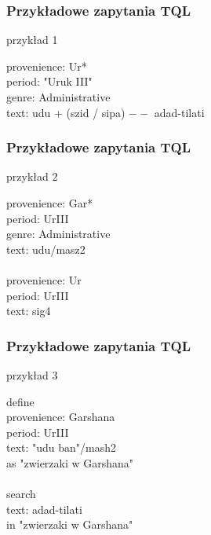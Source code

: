 \documentclass[xcolor=dvipsnames,10pt]{beamer}
\begin{document}
\begin{frame}


     \frametitle{Przykładowe zapytania TQL}

\begin{block}{przykład 1}

provenience: Ur*\\
period: "Uruk III"\\
genre: Administrative\\
text: udu + (szid / sipa) $--$ adad-tilati\\

\end{block}
\end{frame}



\begin{frame}

     \frametitle{Przykładowe zapytania TQL}

\begin{block}{przykład 2}

provenience: Gar*\\
period: UrIII\\
genre: Administrative\\
text: udu/masz2\\
~\\
provenience: Ur\\
period: UrIII\\
text: sig4\\
\end{block}
\end{frame}



\begin{frame}
 \frametitle{Przykładowe zapytania TQL}

\begin{block}{przykład 3}

define\\
  provenience: Garshana\\
  period: UrIII\\
  text: "udu ban"/mash2\\
as "zwierzaki w Garshana"\\
~\\
search\\
  text: adad-tilati\\
in "zwierzaki w Garshana"\\

\end{block}

\end{frame}
\end{document}
